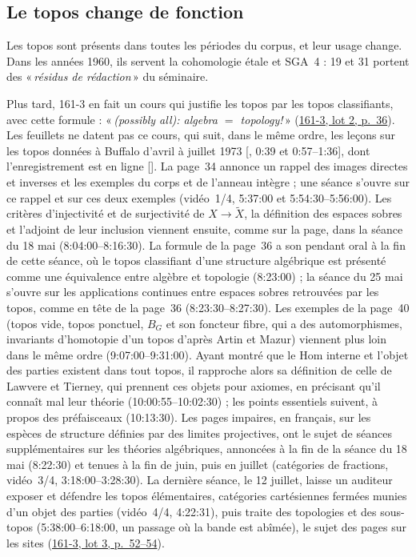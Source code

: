 \documentclass[11pt]{amsart}
\makeatletter
\newcommand{\ts}[1]{\foreignlanguage{english}{#1}}
\newcommand{\q}[1]{«\,\textit{#1}\,»}
\def\RHM@first#1--#2\@nil{#1}
\DeclareRobustCommand{\lot}[3]{\begingroup\edef\RHM@pdfpage{\the\numexpr\RHM@first#3--\@nil+1\relax}\href{https://grothendieck.umontpellier.fr/#1.pdf\#page=\RHM@pdfpage}{#1, lot #2, p.~#3}\endgroup}
\newcommand{\lot}[3]{\href{https://grothendieck.commutator.io/\##1/#2/p#3}{#1, lot #2, p.~#3}}
\makeatother
\begin{document}
\subsection{Le topos change de fonction}\label{sub:topos}

Les topos sont présents dans toutes les périodes du corpus, et leur usage change. Dans les années 1960, ils servent la cohomologie étale et SGA~4 : 19 et 31 portent des \q{résidus de rédaction} du séminaire.

Plus tard, 161-3 en fait un cours qui justifie les topos par les topos classifiants, avec cette formule : \q{(possibly all): algebra $=$ topology!} (\lot{161-3}{2}{36}). Les feuillets ne datent pas ce cours, qui suit, dans le même ordre, les leçons sur les topos données à Buffalo d'avril à juillet 1973 [\citealp{mclarty2018}, \ts{0:39} et \ts{0:57--1:36}], dont l'enregistrement est en ligne [\citealp{buffalo1973topos}]. La page~34 annonce un rappel des images directes et inverses et les exemples du corps et de l'anneau intègre ; une séance s'ouvre sur ce rappel et sur ces deux exemples (vidéo~1/4, \ts{5:37:00} et \ts{5:54:30--5:56:00}). Les critères d'injectivité et de surjectivité de $X \to \widetilde{X}$, la définition des espaces sobres et l'adjoint de leur inclusion viennent ensuite, comme sur la page, dans la séance du 18 mai (\ts{8:04:00--8:16:30}). La formule de la page~36 a son pendant oral à la fin de cette séance, où le topos classifiant d'une structure algébrique est présenté comme une équivalence entre algèbre et topologie (\ts{8:23:00}) ; la séance du 25 mai s'ouvre sur les applications continues entre espaces sobres retrouvées par les topos, comme en tête de la page~36 (\ts{8:23:30--8:27:30}). Les exemples de la page~40 (topos vide, topos ponctuel, $B_{G}$ et son foncteur fibre, qui a des automorphismes, invariants d'homotopie d'un topos d'après Artin et Mazur) viennent plus loin dans le même ordre (\ts{9:07:00--9:31:00}). Ayant montré que le Hom interne et l'objet des parties existent dans tout topos, il rapproche alors sa définition de celle de Lawvere et Tierney, qui prennent ces objets pour axiomes, en précisant qu'il connaît mal leur théorie (\ts{10:00:55--10:02:30}) ; les points essentiels suivent, à propos des préfaisceaux (\ts{10:13:30}). Les pages impaires, en français, sur les espèces de structure définies par des limites projectives, ont le sujet de séances supplémentaires sur les théories algébriques, annoncées à la fin de la séance du 18 mai (\ts{8:22:30}) et tenues à la fin de juin, puis en juillet (catégories de fractions, vidéo~3/4, \ts{3:18:00--3:28:30}). La dernière séance, le 12 juillet, laisse un auditeur exposer et défendre les topos élémentaires, catégories cartésiennes fermées munies d'un objet des parties (vidéo~4/4, \ts{4:22:31}), puis traite des topologies et des sous-topos (\ts{5:38:00--6:18:00}, un passage où la bande est abîmée), le sujet des pages sur les sites (\lot{161-3}{3}{52--54}).
\end{document}

